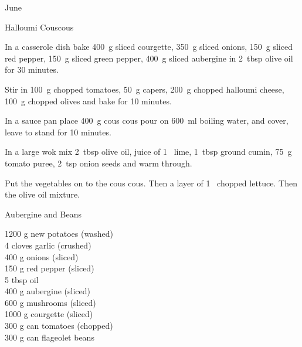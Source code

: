 \begin{menu}{June}
\begin{recipe}{2}{Halloumi Couscous}
\begin{ingredients}
		\end{ingredients}
	
    \begin{instructions}
    \item 
        In a casserole dish bake
        400~g sliced courgette,
        350~g sliced onions,
        150~g sliced red pepper,
        150~g sliced green pepper,
        400~g sliced aubergine
        in
        2~tbsp  olive oil
        for 30 minutes.
      \item 
        Stir in
        100~g chopped tomatoes,
        50~g  capers,
        200~g chopped halloumi cheese,
        100~g chopped olives
        and bake for 10 minutes.
      \item 
      In a
      sauce pan 
      place
      400~g  cous cous
      pour on
      600~ml  boiling water,
      and cover, leave to stand for 10 minutes.
    \item 
        In a large wok mix
        2~tbsp  olive oil,
        juice of
        1~  lime,
        1~tbsp  ground cumin,
        75~g  tomato puree,
        2~tsp  onion seeds
        and warm through.
      \item 
        Put the vegetables on to the cous cous.
        Then a layer of
        1~ chopped lettuce.
        Then the olive oil mixture.
      
    \end{instructions}
    \end{recipe}%
  
    \begin{recipe}{2}{Aubergine and Beans}%
		\begin{ingredients}
		1200 g new potatoes (washed) \\
	4 cloves garlic (crushed) \\
	400 g onions (sliced) \\
	150 g red pepper (sliced) \\
	5 tbsp oil  \\
	400 g aubergine (sliced) \\
	600 g mushrooms (sliced) \\
	1000 g courgette (sliced) \\
	300 g can tomatoes (chopped) \\
	300 g can flageolet beans  \\
	
		\end{ingredients}
	

\end{recipe}
\end{menu}
